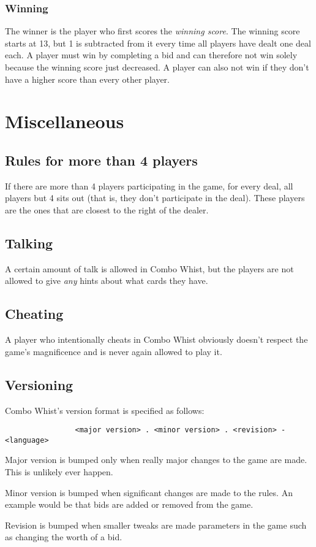 \documentclass[a4paper]{article}
\begin{document}
{{			\subsubsection{Winning}{%
				The winner is the player who first scores the \emph{winning score}. The winning score starts at 13, but 1 is subtracted from it every time all players have dealt one deal each. A player must win by completing a bid and can therefore not win solely because the winning score just decreased. A player can also not win if they don't have a higher score than every other player.
			}
		}
	}

	\section{Miscellaneous}{%
		\subsection{Rules for more than 4 players}{%
			If there are more than 4 players participating in the game, for every deal, all players but 4 sits out (that is, they don't participate in the deal). These players are the ones that are closest to the right of the dealer.
		}
		
		\subsection{Talking}{%
			A certain amount of talk is allowed in Combo Whist, but the players are not allowed to give \emph{any} hints about what cards they have.
		}
		
		\subsection{Cheating}{%
			A player who intentionally cheats in Combo Whist obviously doesn't respect the game's magnificence and is never again allowed to play it.
		}

		\subsection{Versioning}{%
			Combo Whist's version format is specified as follows:
			\begin{verbatim}
				<major version> . <minor version> . <revision> - <language>
			\end{verbatim}

			Major version is bumped only when really major changes to the game are made. This is unlikely ever happen.

			Minor version is bumped when significant changes are made to the rules. An example would be that bids are added or removed from the game.

			Revision is bumped when smaller tweaks are made parameters in the game such as changing the worth of a bid.
		}
	}

	\pagebreak
	
	
\end{document}
